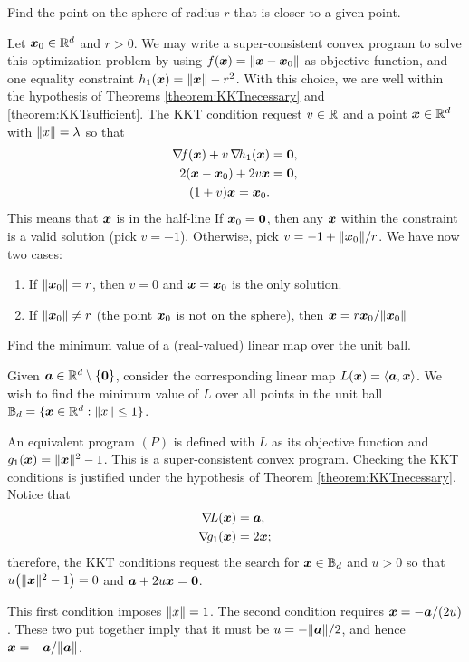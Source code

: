 \begin{example}
Find the point on the sphere of radius $r$ that is closer to a given point.

Let $\boldsymbol{x}_0 \in \mathbb{R}^d$ and $r>0$.  We may write a super-consistent convex program to solve this optimization problem by using $f(\boldsymbol{x})=\lVert \boldsymbol{x}-\boldsymbol{x}_0 \rVert$ as objective function, and one equality constraint $h_1(\boldsymbol{x})=\lVert \boldsymbol{x} \rVert-r^2$.  With this choice, we are well within the hypothesis of Theorems \ref{theorem:KKTnecessary} and \ref{theorem:KKTsufficient}.  The KKT condition request $v \in \mathbb{R}$ and a point $\boldsymbol{x} \in \mathbb{R}^d$ with $\lVert x \rVert = \lambda$ so that
\begin{align*} 
\mathop{\nabla\! {f}}(\boldsymbol{x}) + v\mathop{\nabla\! {h_1}}(\boldsymbol{x}) &= \boldsymbol{0}, \\
2(\boldsymbol{x}-\boldsymbol{x}_0)+2v\boldsymbol{x} &= \boldsymbol{0}, \\
(1+v)\boldsymbol{x} = \boldsymbol{x}_0.
\end{align*}
This means that $\boldsymbol{x}$ is in the half-line 
If $\boldsymbol{x}_0 = \boldsymbol{0}$, then any $\boldsymbol{x}$ within the constraint is a valid solution (pick $v=-1$).  Otherwise, pick $v = -1+\lVert \boldsymbol{x}_0 \rVert/r$.  We have now two cases:
\begin{enumerate}
	\item If $\lVert \boldsymbol{x}_0 \rVert=r$, then $v=0$ and $\boldsymbol{x}=\boldsymbol{x}_0$ is the only solution.
	\item If $\lVert \boldsymbol{x}_0 \rVert \neq r$ (the point $\boldsymbol{x}_0$ is not on the sphere), then $\boldsymbol{x} = r\boldsymbol{x}_0/\lVert \boldsymbol{x}_0 \rVert$
\end{enumerate}
\end{example}

\begin{example}
Find the minimum value of a (real-valued) linear map over the unit ball.

Given $\boldsymbol{a} \in \mathbb{R}^d\setminus\{ \boldsymbol{0}\}$, consider the corresponding linear map $L(\boldsymbol{x}) = \langle \boldsymbol{a}, \boldsymbol{x} \rangle$.  We wish to find the minimum value of $L$ over all points in the unit ball $\mathbb{B}_d = \{ \boldsymbol{x} \in \mathbb{R}^d : \lVert x \rVert \leq 1 \}$.

An equivalent program $(P)$ is defined with $L$ as its objective function and $g_1(\boldsymbol{x}) = \lVert \boldsymbol{x} \rVert^2-1$. This is a super-consistent convex program.  Checking the KKT conditions is justified under the hypothesis of Theorem \ref{theorem:KKTnecessary}. Notice that
\begin{align*}
\mathop{\nabla\! {L}}(\boldsymbol{x}) &= \boldsymbol{a}, \\
\mathop{\nabla\! {g_1}}(\boldsymbol{x}) &= 2\boldsymbol{x};
\end{align*}
therefore, the KKT conditions request the search for $\boldsymbol{x} \in \mathbb{B}_d$ and $u > 0$ so that $u\big( \lVert \boldsymbol{x} \rVert^2-1 \big)=0$ and $\boldsymbol{a}+2u\boldsymbol{x}=\boldsymbol{0}$.

This first condition imposes $\lVert x \rVert=1$.  The second condition requires $\boldsymbol{x} = -\boldsymbol{a}/(2u)$.  These two put together imply that it must be $u = -\lVert \boldsymbol{a} \rVert/2$, and hence $\boldsymbol{x} = -\boldsymbol{a}/\lVert \boldsymbol{a} \rVert$.
\end{example}
